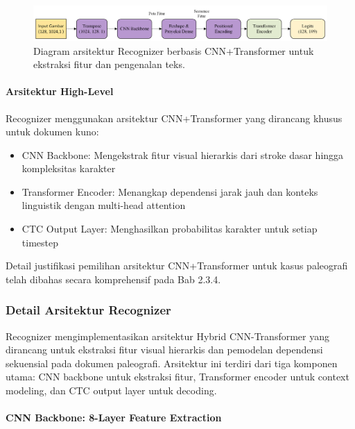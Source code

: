 \documentclass[12pt,a4paper]{article}
\begin{document}
\begin{figure}[H]
\centering
\includegraphics[width=\textwidth, height=1\textheight, keepaspectratio]{images/Recognizer.png}
\caption{Diagram arsitektur Recognizer berbasis CNN+Transformer untuk ekstraksi fitur dan pengenalan teks.}
\label{fig:recognizer_arch}
\end{figure}

\paragraph{Arsitektur High-Level}

Recognizer menggunakan arsitektur CNN+Transformer yang dirancang khusus untuk dokumen kuno:

\begin{itemize}
    \item CNN Backbone: Mengekstrak fitur visual hierarkis dari stroke dasar hingga kompleksitas karakter
    \item Transformer Encoder: Menangkap dependensi jarak jauh dan konteks linguistik dengan multi-head attention
    \item CTC Output Layer: Menghasilkan probabilitas karakter untuk setiap timestep
\end{itemize}

Detail justifikasi pemilihan arsitektur CNN+Transformer untuk kasus paleografi telah dibahas secara komprehensif pada Bab 2.3.4.
\subsubsection{Detail Arsitektur Recognizer}
\label{subsubsec:detail-arsitektur-recognizer}

Recognizer mengimplementasikan arsitektur Hybrid CNN-Transformer yang dirancang untuk ekstraksi fitur visual hierarkis dan pemodelan dependensi sekuensial pada dokumen paleografi. Arsitektur ini terdiri dari tiga komponen utama: CNN backbone untuk ekstraksi fitur, Transformer encoder untuk context modeling, dan CTC output layer untuk decoding.

\paragraph{CNN Backbone: 8-Layer Feature Extraction}
\end{document}
